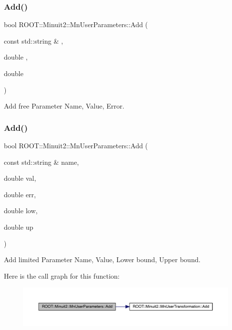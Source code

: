 \subsubsection{\texorpdfstring{Add()}{Add()}\hspace{0.1cm}{\footnotesize\ttfamily [2/6]}}
{\footnotesize\ttfamily bool R\+O\+O\+T\+::\+Minuit2\+::\+Mn\+User\+Parameters\+::\+Add (\begin{DoxyParamCaption}\item[{const std\+::string \&}]{,  }\item[{double}]{,  }\item[{double}]{ }\end{DoxyParamCaption})}



Add free Parameter Name, Value, Error. 

\mbox{\label{classROOT_1_1Minuit2_1_1MnUserParameters_ab5e82031e879bf6937975b884784c126}} 
\subsubsection{\texorpdfstring{Add()}{Add()}\hspace{0.1cm}{\footnotesize\ttfamily [3/6]}}
{\footnotesize\ttfamily bool R\+O\+O\+T\+::\+Minuit2\+::\+Mn\+User\+Parameters\+::\+Add (\begin{DoxyParamCaption}\item[{const std\+::string \&}]{name,  }\item[{double}]{val,  }\item[{double}]{err,  }\item[{double}]{low,  }\item[{double}]{up }\end{DoxyParamCaption})}



Add limited Parameter Name, Value, Lower bound, Upper bound. 

Here is the call graph for this function\+:\nopagebreak
\begin{figure}[H]
\begin{center}
\leavevmode
\includegraphics[width=350pt]{d6/d10/classROOT_1_1Minuit2_1_1MnUserParameters_ab5e82031e879bf6937975b884784c126_cgraph}
\end{center}
\end{figure}
\mbox{\label{classROOT_1_1Minuit2_1_1MnUserParameters_ab5e82031e879bf6937975b884784c126}} 
